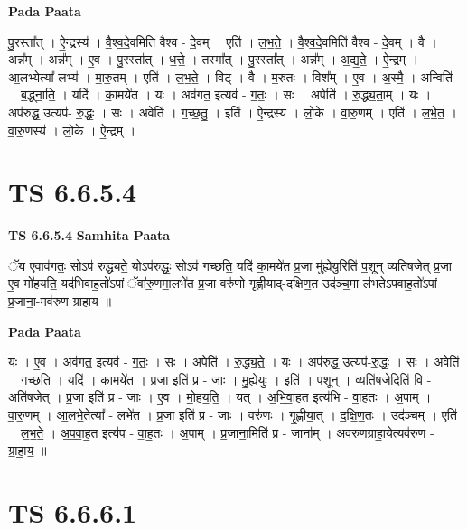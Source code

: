\documentclass[17pt]{extarticle}
\begin{document}
\textbf{Pada Paata} \newline

पु॒रस्ता᳚त् । ऐ॒न्द्रस्य॑ । वै॒श्व॒दे॒वमिति॑ वैश्व - दे॒वम् । एति॑ । ल॒भ॒ते॒ । वै॒श्व॒दे॒वमिति॑ वैश्व - दे॒वम् । वै । अन्न᳚म् । अन्न᳚म् । ए॒व । पु॒रस्ता᳚त् । ध॒त्ते॒ । तस्मा᳚त् । पु॒रस्ता᳚त् । अन्न᳚म् । अ॒द्य॒ते॒ । ऐ॒न्द्रम् । आ॒लभ्येत्या᳚-लभ्य॑ । मा॒रु॒तम् । एति॑ । ल॒भ॒ते॒ । विट् । वै । म॒रुतः॑ । विश᳚म् । ए॒व । अ॒स्मै॒ । अन्विति॑ । ब॒द्ध्ना॒ति॒ । यदि॑ । का॒मये॑त । यः । अव॑गत॒ इत्यव॑ - ग॒तः॒ । सः । अपेति॑ । रु॒द्ध्य॒ता॒म् । यः । अप॑रुद्ध॒ उत्यप॑- रु॒द्धः॒ । सः । अवेति॑ । ग॒च्छ॒तु॒ । इति॑ । ऐ॒न्द्रस्य॑ । लो॒के । वा॒रु॒णम् । एति॑ । ल॒भे॒त॒ । वा॒रु॒णस्य॑ । लो॒के । ऐ॒न्द्रम् ।  \newline





\section{ TS 6.6.5.4 }

\textbf{TS 6.6.5.4 } \newline
\textbf{Samhita Paata} \newline

ॅय ए॒वाव॑गतः॒ सोऽप॑ रुद्ध्यते॒ योऽप॑रुद्धः॒ सोऽव॑ गच्छति॒ यदि॑ का॒मये॑त प्र॒जा मु॑ह्येयु॒रिति॑ प॒शून् व्यति॑षजेत् प्र॒जा ए॒व मो॑हयति॒ यद॑भिवाह॒तो॑ऽपां ॅवा॑रु॒णमा॒लभे॑त प्र॒जा वरु॑णो गृह्णीयाद्-दक्षिण॒त उद॑ञ्च॒मा ल॑भतेऽपवाह॒तो॑ऽपां प्र॒जाना॒-मव॑रुण ग्राहाय ॥ \newline

\textbf{Pada Paata} \newline

यः । ए॒व । अव॑गत॒ इत्यव॑ - ग॒तः॒ । सः । अपेति॑ । रु॒द्ध्य॒ते॒ । यः । अप॑रुद्ध॒ उत्यप॑-रु॒द्धः॒ । सः । अवेति॑ । ग॒च्छ॒ति॒ । यदि॑ । का॒मये॑त । प्र॒जा इति॑ प्र - जाः । मु॒ह्ये॒युः॒ । इति॑ । प॒शून् । व्यति॑षजे॒दिति॑ वि - अति॑षजेत् । प्र॒जा इति॑ प्र - जाः । ए॒व । मो॒ह॒य॒ति॒ । यत् । अ॒भि॒वा॒ह॒त इत्य॑भि - वा॒ह॒तः । अ॒पाम् । वा॒रु॒णम् । आ॒लभे॒तेत्या᳚ - लभे॑त । प्र॒जा इति॑ प्र - जाः । वरु॑णः । गृ॒ह्णी॒या॒त् । द॒क्षि॒ण॒तः । उद॑ञ्चम् । एति॑ । ल॒भ॒ते॒ । अ॒प॒वा॒ह॒त इत्य॑प - वा॒ह॒तः । अ॒पाम् । प्र॒जाना॒मिति॑ प्र - जाना᳚म् । अव॑रुणग्राहा॒येत्यव॑रुण - ग्रा॒हा॒य॒ ॥  \newline





\section{ TS 6.6.6.1 }
\end{document}
